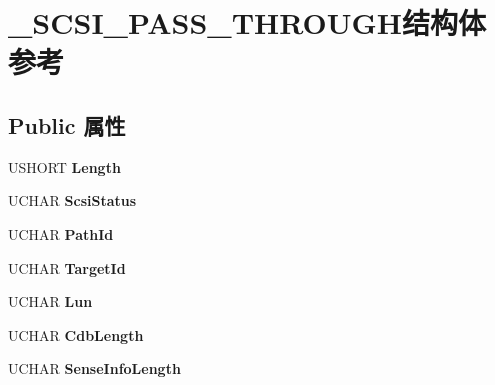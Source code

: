 \hypertarget{struct___s_c_s_i___p_a_s_s___t_h_r_o_u_g_h}{}\section{\+\_\+\+S\+C\+S\+I\+\_\+\+P\+A\+S\+S\+\_\+\+T\+H\+R\+O\+U\+G\+H结构体 参考}
\label{struct___s_c_s_i___p_a_s_s___t_h_r_o_u_g_h}
\subsection*{Public 属性}
\begin{DoxyCompactItemize}
\item 
\mbox{\label{struct___s_c_s_i___p_a_s_s___t_h_r_o_u_g_h_a7322f54993d1c0aebffdad3db3d641b6}} 
U\+S\+H\+O\+RT {\bfseries Length}
\item 
\mbox{\label{struct___s_c_s_i___p_a_s_s___t_h_r_o_u_g_h_ae7e0ba78354dd4f6b921ac06e00c3f26}} 
U\+C\+H\+AR {\bfseries Scsi\+Status}
\item 
\mbox{\label{struct___s_c_s_i___p_a_s_s___t_h_r_o_u_g_h_a5109ffb7ec7222c27b32d720f37fe643}} 
U\+C\+H\+AR {\bfseries Path\+Id}
\item 
\mbox{\label{struct___s_c_s_i___p_a_s_s___t_h_r_o_u_g_h_ae7085c1101652b32db8a3a3e4102ba1e}} 
U\+C\+H\+AR {\bfseries Target\+Id}
\item 
\mbox{\label{struct___s_c_s_i___p_a_s_s___t_h_r_o_u_g_h_a36b25be1e7f4aaff80b0dd47c708fb83}} 
U\+C\+H\+AR {\bfseries Lun}
\item 
\mbox{\label{struct___s_c_s_i___p_a_s_s___t_h_r_o_u_g_h_a72b55380a4b9318de60f96bfc5202959}} 
U\+C\+H\+AR {\bfseries Cdb\+Length}
\item 
\mbox{\label{struct___s_c_s_i___p_a_s_s___t_h_r_o_u_g_h_a7b5313cf4ab04fd48d545f844fd7087c}} 
U\+C\+H\+AR {\bfseries Sense\+Info\+Length}
\item 

\end{DoxyCompactItemize}
